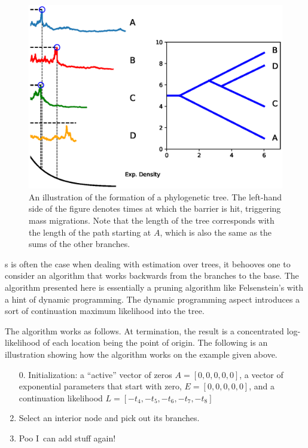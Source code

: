\documentclass[11pt]{article}
\begin{document}
\begin{figure}
\begin{center}
\includegraphics[width=\textwidth]{AncillaryFiles//figure3.eps}
\caption{An illustration of the formation of a phylogenetic tree. The left-hand side of the figure denotes times at which the barrier is hit, triggering mass migrations. Note that the length of the tree corresponds with the length of the path starting at $A$, which is also the same as the sums of the other branches.} \label{fig1}
\end{center} 
\end{figure}


s is often the case when dealing with estimation over trees, it behooves one to consider an algorithm that works backwards from the branches to the base. The algorithm presented here is essentially a pruning algorithm like Felsenstein's with a hint of dynamic programming. The dynamic programming aspect introduces a sort of continuation maximum likelihood into the tree.

The algorithm works as follows. At termination, the result is a concentrated log-likelihood of each location being the point of origin.  The following is an illustration showing how the algorithm works on the example given above.

\begin{enumerate}
\item[0.] Initialization: a ``active'' vector of zeros $A=[0,0,0,0,0]$, a vector of exponential parameters that start with zero, $E=[0,0,0,0,0]$, and a continuation likelihood $L=[-t_4,-t_5,-t_6,-t_7,-t_8]$
\item  Select an interior node and pick out its branches.
\item  Poo I\ can add stuff again! \end{enumerate}

\cite{gildner91}
\cite{dowd09}\cite{rdgn99}







\end{document}
